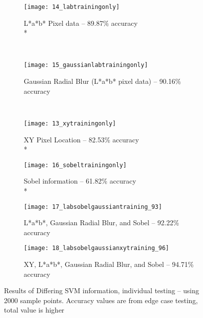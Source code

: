 \begin{figure}[h]
        \centering
        \begin{subfigure}[b]{0.3\textwidth}
                \centering
                \texttt{[image: 14\_labtrainingonly]}
                \caption{L*a*b* Pixel data -- 89.87\% accuracy \\*}
                \label{fig:14_labtrainingonly}
        \end{subfigure}%
        ~ %
        \begin{subfigure}[b]{0.3\textwidth}
                \centering

                \texttt{[image: 15\_gaussianlabtrainingonly]}
                \caption{Gaussian Radial Blur (L*a*b* pixel data) -- 90.16\% accuracy}
                \label{fig:15_gaussianlabtrainingonly}     
        \end{subfigure}
        ~ %
        \begin{subfigure}[b]{0.3\textwidth}
                \centering

                \texttt{[image: 13\_xytrainingonly]}
                \caption{XY Pixel Location -- 82.53\% accuracy \\*}
                \label{fig:13_xytrainingonly}
        \end{subfigure}
         \begin{subfigure}[b]{0.3\textwidth}
                \centering

                \texttt{[image: 16\_sobeltrainingonly]}
                \caption{Sobel information -- 61.82\% accuracy \\*}
                \label{fig:16_sobeltrainingonly}
        \end{subfigure}
        \begin{subfigure}[b]{0.3\textwidth}
                \centering

                \texttt{[image: 17\_labsobelgaussiantraining\_93]}
                \caption{L*a*b*, Gaussian Radial Blur, and Sobel -- 92.22\% accuracy}
                \label{fig:17_labsobelgaussiantraining_93}
        \end{subfigure}
        \begin{subfigure}[b]{0.3\textwidth}
                \centering

                \texttt{[image: 18\_labsobelgaussianxytraining\_96]}
                \caption{XY, L*a*b*, Gaussian Radial Blur, and Sobel -- 94.71\% accuracy}
                \label{fig:18_labsobelgaussianxytraining_96}
        \end{subfigure}

        \caption{Results of Differing SVM information, individual testing -- using 2000 sample points. Accuracy values are from edge case testing, total value is higher}\label{fig:labResults}
\end{figure}
